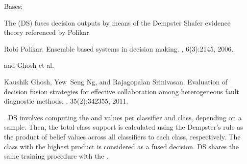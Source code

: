 \documentclass[letterpaper,10pt,english]{sphinxmanual}
\begin{document}
\begin{fulllineitems}
\label{\detokenize{pusion.core.dempster_shafer_combiner:pusion.core.dempster_shafer_combiner.DempsterShaferCombiner}}
\sphinxAtStartPar
Bases: {\hyperref[\detokenize{pusion.core.combiner:pusion.core.combiner.TrainableCombiner}]{}}

\sphinxAtStartPar
The {\hyperref[\detokenize{pusion.core.dempster_shafer_combiner:pusion.core.dempster_shafer_combiner.DempsterShaferCombiner}]{}} (DS) fuses decision outputs by means of the Dempster Shafer evidence theory
referenced by Polikar %
\begin{footnote}[1]\sphinxAtStartFootnote
Robi Polikar. Ensemble based systems in decision making. , 6(3):21\textendash{}45, 2006.
%
\end{footnote} and Ghosh et al. %
\begin{footnote}[2]\sphinxAtStartFootnote
Kaushik Ghosh, Yew Seng Ng, and Rajagopalan Srinivasan. Evaluation of decision fusion strategies for effective collaboration among heterogeneous fault diagnostic methods. , 35(2):342\textendash{}355, 2011.
%
\end{footnote}.
DS involves computing the  and  values per classifier and class, depending on a sample.
Then, the total class support is calculated using the Dempster’s rule as the product of belief values across all
classifiers to each class, respectively. The class with the highest product is considered as a fused decision.
DS shares the same training procedure with the .

\sphinxAtStartPar



\end{fulllineitems}
\end{document}
